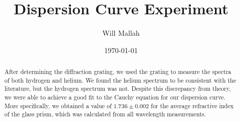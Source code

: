 \documentclass[12pt]{article}
\title{Dispersion Curve Experiment}
\author{Will Mallah}
\date{\today}
\begin{document}
\maketitle

\begin{abstract}
    After determining the diffraction grating, we used the grating to measure the spectra of both hydrogen and helium. We found the helium spectrum to be consistent with the literature, but the hydrogen spectrum was not. Despite this discrepancy from theory, we were able to achieve a good fit to the Cauchy equation for our dispersion curve. More specifically, we obtained a value of $1.736 \pm 0.002$ for the average refractive index of the glass prism, which was calculated from all wavelength measurements.
\end{abstract}
\end{document}
